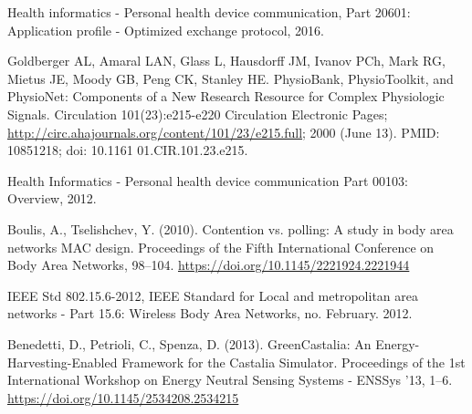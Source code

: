 \documentclass[conference]{IEEEtran}
\begin{document}
\begin{thebibliography}{00}
 Health informatics - Personal health device communication, Part 20601: Application profile - Optimized exchange protocol, 2016.

 Goldberger AL, Amaral LAN, Glass L, Hausdorff JM, Ivanov PCh, Mark RG, Mietus JE, Moody GB, Peng CK, Stanley HE. PhysioBank, PhysioToolkit, and PhysioNet: Components of a New Research Resource for Complex Physiologic Signals. Circulation 101(23):e215-e220 Circulation Electronic Pages; \url{http://circ.ahajournals.org/content/101/23/e215.full}; 2000 (June 13). PMID: 10851218; doi: 10.1161 01.CIR.101.23.e215.

  Health Informatics - Personal health device communication Part 00103: Overview, 2012.

 Boulis, A., Tselishchev, Y. (2010). Contention vs. polling: A study in body area networks MAC design. Proceedings of the Fifth International Conference on Body Area Networks, 98–104. \url{https://doi.org/10.1145/2221924.2221944}

 IEEE Std 802.15.6-2012, IEEE Standard for Local and metropolitan area networks - Part 15.6: Wireless Body Area Networks, no. February. 2012.

 Benedetti, D., Petrioli, C., Spenza, D. (2013). GreenCastalia: An Energy-Harvesting-Enabled Framework for the Castalia Simulator. Proceedings of the 1st International Workshop on Energy Neutral Sensing Systems - ENSSys ’13, 1–6. \url{https://doi.org/10.1145/2534208.2534215}


\end{thebibliography}
\end{document}

